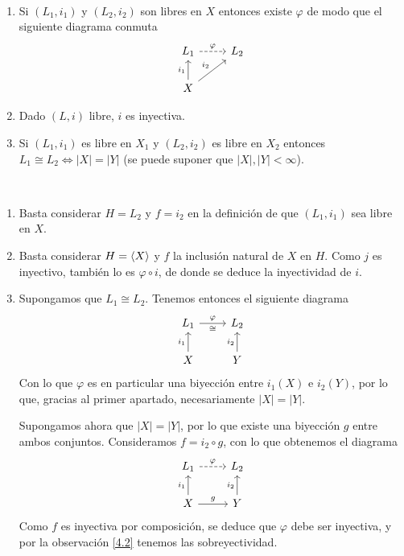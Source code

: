\documentclass[twoside, 11pt]{article}
\begin{document}
\begin{prop}\
\begin{enumerate}
\item Si $(L_1,i_1)$ y $(L_2,i_2)$ son libres en $X$ entonces existe $\varphi$ de modo que el siguiente diagrama conmuta
\[
\begin{tikzcd}
L_1\arrow[r, dashed,"\varphi"] & L_2\\
X\arrow[u, "i_1"]\arrow[ur, "i_2"]&
\end{tikzcd}
\]
\item Dado $(L,i)$ libre, $i$ es inyectiva. 
\item Si $(L_1,i_1)$ es libre en $X_1$ y $(L_2,i_2)$ es libre en $X_2$ entonces $L_1\cong L_2\Leftrightarrow |X|=|Y|$ (se puede suponer que $|X|,|Y|<\infty$).
\end{enumerate}
\end{prop}
\begin{dem}\
\begin{enumerate}
\item Basta considerar $H=L_2$ y $f=i_2$ en la definición de que $(L_1,i_1)$ sea libre en $X$. 
\item Basta considerar $H=\langle{X}\rangle$ y $f$ la inclusión natural de $X$ en $H$. Como $j$ es inyectivo, también lo es $\varphi\circ i$, de donde se deduce la inyectividad de $i$.
\item Supongamos que $L_1\cong L_2$. Tenemos entonces el siguiente diagrama
\[
\begin{tikzcd}
L_1\arrow[r, "\varphi", "\cong"'] & L_2\\
X\arrow[u, "i_1"] & Y\arrow[u, "i_2"]
\end{tikzcd}
\]
Con lo que $\varphi$ es en particular una biyección entre $i_1(X)$ e $i_2(Y)$, por lo que, gracias al primer apartado, necesariamente $|X|=|Y|$.

Supongamos ahora que $|X|=|Y|$, por lo que existe una biyección $g$ entre ambos conjuntos. Consideramos $f=i_2\circ g$, con lo que obtenemos el diagrama
\[
\begin{tikzcd}
L_1\arrow[r, dashed, "\varphi"] & L_2\\
X\arrow[u, "i_1"]\arrow[r,"g"] & Y\arrow[u, "i_2"]
\end{tikzcd}
\]
Como $f$ es inyectiva por composición, se deduce que $\varphi$ debe ser inyectiva, y por la observación \ref{4.2} tenemos las sobreyectividad.
\end{enumerate}
\QED
\end{dem}
\end{document}

